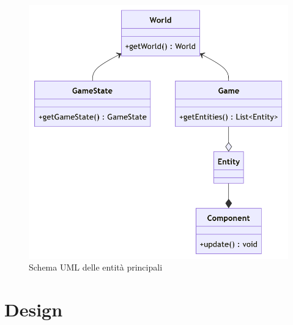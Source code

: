 \documentclass[a4paper,12pt]{report}
\begin{document}
\begin{figure}[H]
    \centering{}
    \includegraphics[width=1\textwidth]{img/UMLAnalisi.png}
    \caption{Schema UML delle entità principali}
\end{figure}


\chapter{Design}
\end{document}
